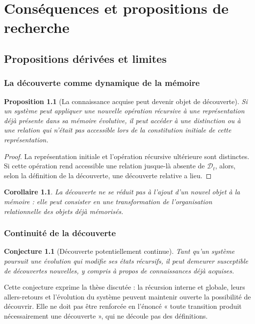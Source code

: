 \documentclass[11pt,a4paper,openany]{book}
\newtheorem{proposition}[definition]{Proposition}
\newtheorem{corollary}[definition]{Corollaire}
\newtheorem{conjecture}[definition]{Conjecture}
\begin{document}
\part{Conséquences et propositions de recherche}
\chapter{Propositions dérivées et limites}

\section{La découverte comme dynamique de la mémoire}
\begin{proposition}[La connaissance acquise peut devenir objet de découverte]
Si un système peut appliquer une nouvelle opération récursive à une représentation déjà présente dans sa mémoire évolutive, il peut accéder à une distinction ou à une relation qui n'était pas accessible lors de la constitution initiale de cette représentation.
\end{proposition}
\begin{proof}
La représentation initiale et l'opération récursive ultérieure sont distinctes. Si cette opération rend accessible une relation jusque-là absente de $\mathcal D_t$, alors, selon la définition de la découverte, une découverte relative a lieu.\end{proof}

\begin{corollary}
La découverte ne se réduit pas à l'ajout d'un nouvel objet à la mémoire : elle peut consister en une transformation de l'organisation relationnelle des objets déjà mémorisés.
\end{corollary}

\section{Continuité de la découverte}
\begin{conjecture}[Découverte potentiellement continue]
Tant qu'un système poursuit une évolution qui modifie ses états récursifs, il peut demeurer susceptible de découvertes nouvelles, y compris à propos de connaissances déjà acquises.
\end{conjecture}

Cette conjecture exprime la thèse discutée : la récursion interne et globale, leurs allers-retours et l'évolution du système peuvent maintenir ouverte la possibilité de découvrir. Elle ne doit pas être renforcée en l'énoncé « toute transition produit nécessairement une découverte », qui ne découle pas des définitions.
\end{document}
